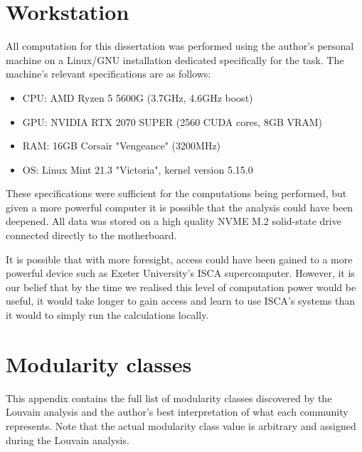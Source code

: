 \documentclass[a4paper,11pt]{article}  %
\begin{document}
	\newpage
	\begin{appendices}
	\section{Workstation}
	\label{app:work}
	All computation for this dissertation was performed using the author's personal machine on a Linux/GNU installation dedicated specifically for the task. The machine's relevant specifications are as follows:
	\begin{itemize}
		\item CPU: AMD Ryzen 5 5600G (3.7GHz, 4.6GHz boost)
		\item GPU: NVIDIA RTX 2070 SUPER (2560 CUDA cores, 8GB VRAM)
		\item RAM: 16GB Corsair "Vengeance" (3200MHz)
		\item OS: Linux Mint 21.3 "Victoria", kernel version 5.15.0
	\end{itemize}
	These specifications were sufficient for the computations being performed, but given a more powerful computer it is possible that the analysis could have been deepened. All data was stored on a high quality NVME M.2 solid-state drive connected directly to the motherboard.
	
	It is possible that with more foresight, access could have been gained to a more powerful device such as Exeter University's ISCA supercomputer. However, it is our belief that by the time we realised this level of computation power would be useful, it would take longer to gain access and learn to use ISCA's systems than it would to simply run the calculations locally.
	\section{Modularity classes}
	\label{app:modularities}
	This appendix contains the full list of modularity classes discovered by the Louvain analysis and the author's best interpretation of what each community represents. Note that the actual modularity class value is arbitrary and assigned during the Louvain analysis.
	

\end{appendices}
\end{document}
